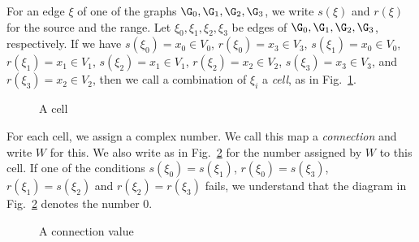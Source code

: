 \documentclass[12pt]{article}
\begin{document}
For an edge $\xi$ of one of the graphs $\G_0,\G_1,\G_2,\G_3$, we
write $s(\xi)$ and $r(\xi)$ for the
source and the range.
Let $\xi_0,\xi_1,\xi_2,\xi_3$ be edges of 
$\G_0,\G_1,\G_2,\G_3$, respectively. 
If we have 
$s(\xi_0)=x_0\in V_0$,
$r(\xi_0)=x_3\in V_3$,
$s(\xi_1)=x_0\in V_0$,
$r(\xi_1)=x_1\in V_1$,
$s(\xi_2)=x_1\in V_1$,
$r(\xi_2)=x_2\in V_2$,
$s(\xi_3)=x_3\in V_3$, and
$r(\xi_3)=x_2\in V_2$,
then we call a combination of $\xi_i$ 
a {\em cell}, as in Fig.~\ref{cell}.

\begin{figure}[H]
\begin{center}
\caption{A cell}
\label{cell}
\end{center}
\end{figure}

For each cell, we assign a complex number.  We call this map
a {\em connection} and write $W$ for this.  We also write
as in Fig.~\ref{connection} for the number assigned by
$W$ to this cell.  If one of the conditions
$s(\xi_0)=s(\xi_1)$,
$r(\xi_0)=s(\xi_3)$,
$r(\xi_1)=s(\xi_2)$ and
$r(\xi_2)=r(\xi_3)$
fails, we understand that the diagram in Fig.~\ref{connection}
denotes the number $0$.

\begin{figure}[H]
\begin{center}
\caption{A connection value}
\label{connection}
\end{center}
\end{figure}
\end{document}
